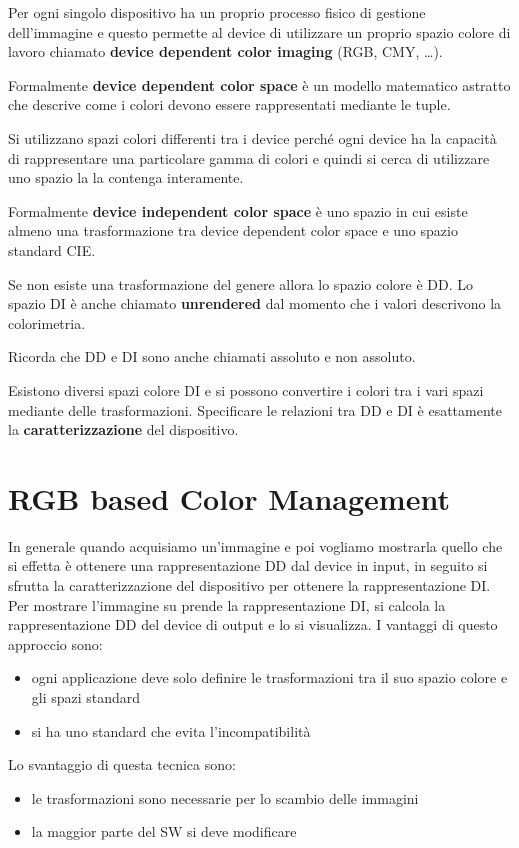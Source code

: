 Per ogni singolo dispositivo ha un proprio processo fisico di gestione dell'immagine e 
questo permette al device di utilizzare un proprio spazio colore di lavoro chiamato 
\textbf{device dependent color imaging} (RGB, CMY, \dots).

\begin{definizione}
    Formalmente \textbf{device dependent color space} è un modello matematico astratto che 
    descrive come i colori devono essere rappresentati mediante le tuple.
\end{definizione}

Si utilizzano spazi colori differenti tra i device perché ogni device ha la capacità
di rappresentare una particolare gamma di colori e quindi si cerca di utilizzare 
uno spazio la la contenga interamente. 

\begin{definizione}
    Formalmente \textbf{device independent color space} è uno spazio in cui esiste
    almeno una trasformazione tra device dependent color space e uno spazio standard 
    CIE.
\end{definizione}

Se non esiste una trasformazione del genere allora lo spazio colore è DD. Lo spazio 
DI è anche chiamato \textbf{unrendered} dal momento che i valori descrivono la colorimetria.

\begin{nota}
    Ricorda che DD e DI sono anche chiamati assoluto e non assoluto.    
\end{nota}

Esistono diversi spazi colore DI e si possono convertire i colori tra i vari spazi
mediante delle trasformazioni. Specificare le relazioni tra DD e DI è esattamente 
la \textbf{caratterizzazione} del dispositivo.  

\section{RGB based Color Management}
In generale quando acquisiamo un'immagine e poi vogliamo mostrarla quello che si 
effetta è ottenere una rappresentazione DD dal device in input, in seguito si sfrutta 
la caratterizzazione del dispositivo per ottenere la rappresentazione DI. Per mostrare 
l'immagine su prende la rappresentazione DI, si calcola la rappresentazione DD del 
device di output e lo si visualizza. I vantaggi di questo approccio sono:
\begin{itemize}
    \item ogni applicazione deve solo definire le trasformazioni tra il suo spazio 
    colore e gli spazi standard
    \item si ha uno standard che evita l'incompatibilità
\end{itemize}
Lo svantaggio di questa tecnica sono:
\begin{itemize}
    \item le trasformazioni sono necessarie per lo scambio delle immagini
    \item la maggior parte del SW si deve modificare
\end{itemize}

